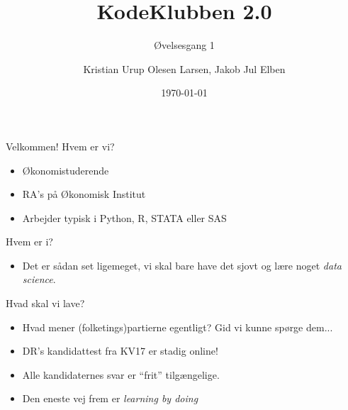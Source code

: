 \documentclass[10pt, hyperref = {colorlinks=true, linkcolor=green}]{beamer}
\title{KodeKlubben 2.0}
\subtitle{Øvelsesgang 1}
\date{\today}
\author{Kristian Urup Olesen Larsen, Jakob Jul Elben}
\institute{Økonomisk Institut, KU}
\begin{document}
\maketitle

\begin{frame}[fragile]{Velkommen!}
Hvem er vi?
\begin{itemize}
  \item Økonomistuderende
  \item RA's på Økonomisk Institut
  \item Arbejder typisk i Python, R, STATA eller SAS
\end{itemize}
Hvem er i?
\begin{itemize}
  \item Det er sådan set ligemeget, vi skal bare have det sjovt og lære noget \textit{data science}.
\end{itemize}
\end{frame}

\begin{frame}[fragile]{Hvad skal vi lave?}
\begin{itemize}
  \item<1-> Hvad mener (folketings)partierne egentligt? Gid vi kunne spørge dem...
  \item<2-> DR's kandidattest fra KV17 er stadig online!
  \item<3-> Alle kandidaternes svar er ``frit'' tilgængelige.
\end{itemize}

\pause
\begin{itemize}
  \item Den eneste vej frem er \textit{learning by doing}
\end{itemize}
\end{frame}
\end{document}
